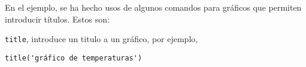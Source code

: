 














En el ejemplo, se ha hecho usos de algunos comandos para gráficos que permiten introducir títulos. Estos son: 

\texttt{title}, introduce un titulo a un gráfico, por ejemplo,
\begin{verbatim}
title('gráfico de temperaturas')
\end{verbatim}

